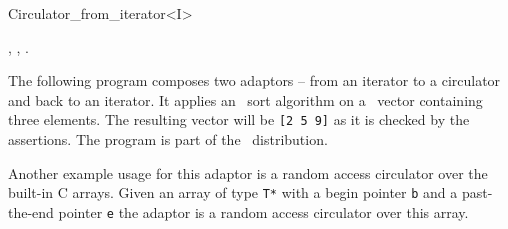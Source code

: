 \begin{ccRefClass}{Circulator_from_iterator<I>}
\ccSeeAlso

,
,
.

\ccExample

The following program composes two adaptors -- from an iterator to a
circulator and back to an iterator. It applies an \stl\ sort algorithm
on a \stl\ vector containing three elements. The resulting vector will
be {\tt [2 5 9]} as it is checked by the assertions. The program is
part of the \cgal\ distribution.


Another example usage for this adaptor is a  random access circulator
over the built-in C arrays. Given an array of type {\tt T*}  with a
begin pointer {\tt b} and a past-the-end pointer {\tt e} the adaptor
 is a random access circulator 
 over this array.

\end{ccRefClass}

